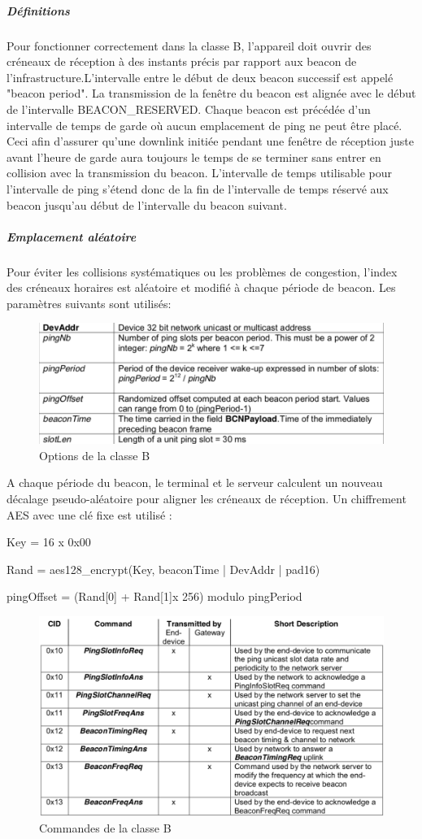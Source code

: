 \documentclass[11pt]{article}
\begin{document}
\subparagraph{ Définitions}
Pour fonctionner correctement dans la classe B, l'appareil doit ouvrir des créneaux de réception à des instants précis par rapport aux beacon de l'infrastructure.L'intervalle entre le début de deux beacon successif est appelé "beacon period". La transmission de la fenêtre du beacon est alignée avec le début de l'intervalle BEACON\_RESERVED. Chaque beacon est précédée d'un intervalle de temps de garde où aucun emplacement de ping ne peut être placé. Ceci afin d'assurer qu'une downlink initiée pendant une fenêtre de réception juste avant l'heure de garde aura toujours le temps de se terminer sans entrer en collision avec la transmission du beacon. L'intervalle de temps utilisable pour l'intervalle de ping s'étend donc de la fin de l'intervalle de temps réservé aux beacon jusqu'au début de l'intervalle du beacon suivant.
\subparagraph{Emplacement aléatoire}
Pour éviter les collisions systématiques ou les problèmes de congestion, l'index des créneaux horaires est aléatoire et modifié à chaque période de beacon. Les paramètres suivants sont utilisés:
\begin{figure}[h!]
\centering
\includegraphics[scale=0.6]{option_random_B.png}
\caption{Options de la classe B}
\end{figure}
A chaque période du beacon, le terminal et le serveur calculent un nouveau décalage pseudo-aléatoire pour aligner les créneaux de réception. Un chiffrement AES avec une clé fixe est utilisé :

Key = 16 x 0x00 

Rand = aes128\_encrypt(Key, beaconTime | DevAddr | pad16)

pingOffset = (Rand[0] + Rand[1]x 256) modulo pingPeriod

\newpage
\begin{figure}[h!]
\centering
\includegraphics[scale=0.6]{classeB_Mac_Commands.png}
\caption{Commandes de la classe B}
\end{figure}
\end{document}
